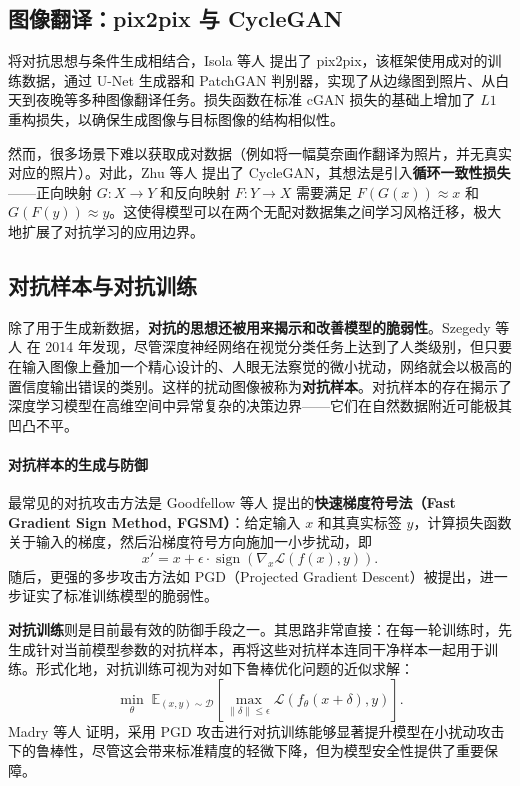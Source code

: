 \subsection{图像翻译：pix2pix 与 CycleGAN}

将对抗思想与条件生成相结合，Isola 等人\cite{isola2018imagetoimagetranslationconditionaladversarial} 提出了 pix2pix，该框架使用成对的训练数据，通过 U-Net 生成器和 PatchGAN 判别器，实现了从边缘图到照片、从白天到夜晚等多种图像翻译任务。损失函数在标准 cGAN 损失的基础上增加了 $L1$ 重构损失，以确保生成图像与目标图像的结构相似性。

然而，很多场景下难以获取成对数据（例如将一幅莫奈画作翻译为照片，并无真实对应的照片）。对此，Zhu 等人\cite{zhu2020unpairedimagetoimagetranslationusing} 提出了 CycleGAN，其想法是引入\textbf{循环一致性损失}——正向映射 $G: X \to Y$ 和反向映射 $F: Y \to X$ 需要满足 $F(G(x)) \approx x$ 和 $G(F(y)) \approx y$。这使得模型可以在两个无配对数据集之间学习风格迁移，极大地扩展了对抗学习的应用边界。

\subsection{对抗样本与对抗训练}

除了用于生成新数据，\textbf{对抗的思想还被用来揭示和改善模型的脆弱性}。Szegedy 等人\cite{szegedy2014intriguingpropertiesneuralnetworks} 在 2014 年发现，尽管深度神经网络在视觉分类任务上达到了人类级别，但只要在输入图像上叠加一个精心设计的、人眼无法察觉的微小扰动，网络就会以极高的置信度输出错误的类别。这样的扰动图像被称为\textbf{对抗样本}。对抗样本的存在揭示了深度学习模型在高维空间中异常复杂的决策边界——它们在自然数据附近可能极其凹凸不平。

\paragraph{对抗样本的生成与防御}

最常见的对抗攻击方法是 Goodfellow 等人\cite{goodfellow2015explainingharnessingadversarialexamples} 提出的\textbf{快速梯度符号法（Fast Gradient Sign Method, FGSM）}：给定输入 $x$ 和其真实标签 $y$，计算损失函数关于输入的梯度，然后沿梯度符号方向施加一小步扰动，即
\[
x' = x + \epsilon \cdot \operatorname{sign}(\nabla_x \mathcal{L}(f(x), y)).
\]
随后，更强的多步攻击方法如 PGD（Projected Gradient Descent）被提出\cite{madry2019deeplearningmodelsresistant}，进一步证实了标准训练模型的脆弱性。

\textbf{对抗训练}则是目前最有效的防御手段之一。其思路非常直接：在每一轮训练时，先生成针对当前模型参数的对抗样本，再将这些对抗样本连同干净样本一起用于训练。形式化地，对抗训练可视为对如下鲁棒优化问题的近似求解：
\[
\min_{\theta} \; \mathbb{E}_{(x, y) \sim \mathcal{D}} \left[ \max_{\|\delta\| \le \epsilon} \mathcal{L}(f_{\theta}(x + \delta), y) \right].
\]
Madry 等人\cite{madry2019deeplearningmodelsresistant} 证明，采用 PGD 攻击进行对抗训练能够显著提升模型在小扰动攻击下的鲁棒性，尽管这会带来标准精度的轻微下降，但为模型安全性提供了重要保障。

